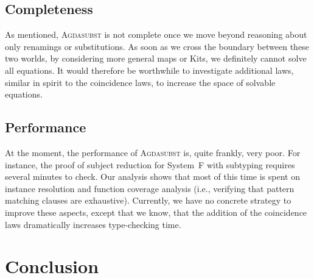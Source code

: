 \documentclass[screen,nonacm]{acmart}
\begin{document}
\subsection*{Completeness}
As mentioned, \textsc{Agdasubst} is not complete once we move beyond reasoning
about only renamings or substitutions. As soon as we cross the boundary between
these two worlds, by considering more general maps or Kits, we definitely
cannot solve all equations. It would therefore be worthwhile to investigate
additional laws, similar in spirit to the coincidence laws, to increase the
space of solvable equations.

\subsection*{Performance}
At the moment, the performance of \textsc{Agdasubst} is, quite frankly, very
poor. For instance, the proof of subject reduction for System~F with subtyping
requires several minutes to check. Our analysis shows that most of this time is
spent on instance resolution and function coverage analysis (i.e., verifying
that pattern matching clauses are exhaustive). Currently, we have no concrete
strategy to improve these aspects, except that we know, that the addition of
the coincidence laws dramatically increases type-checking time.

\section{Conclusion}\label{sec:con}




\end{document}
